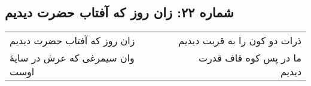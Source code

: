 \begin{center}
\section*{شماره ۲۲: زان روز که آفتاب حضرت دیدیم}
\label{sec:022}
\begin{longtable}{l p{0.5cm} r}
زان روز که آفتاب حضرت دیدیم
&&
ذرات دو کون را به قربت دیدیم
\\
وان سیمرغی که عرش در سایهٔ اوست
&&
ما در پس کوه قاف قدرت دیدیم
\\
\end{longtable}
\end{center}
